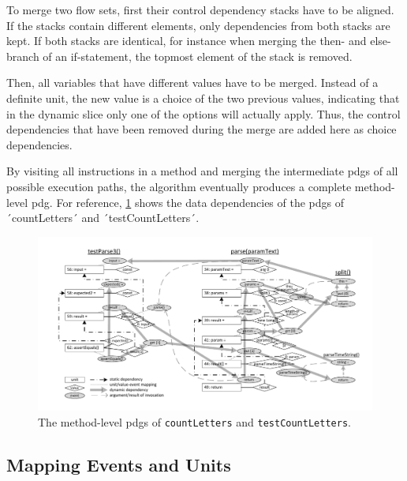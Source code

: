 To merge two flow sets, first their control dependency stacks have to be aligned.
If the stacks contain different elements, only dependencies from both stacks are kept.
If both stacks are identical, for instance when merging the then- and else-branch of an if-statement, the topmost element of the stack is removed.

Then, all variables that have different values have to be merged.
Instead of a definite unit, the new value is a choice of the two previous values, indicating that in the dynamic slice only one of the options will actually apply.
Thus, the control dependencies that have been removed during the merge are added here as choice dependencies.

By visiting all instructions in a method and merging the intermediate \acp{pdg} of all possible execution paths, the algorithm eventually produces a complete method-level \ac{pdg}.
For reference, \cref{fig:graphstatic} shows the data dependencies of the \acp{pdg} of ´countLetters´ and ´testCountLetters´.

\begin{figure}[t]
\centering
\includegraphics[width=.90\linewidth, clip, trim=12mm 7mm 8mm 7mm]{img/graph}
\caption{The method-level \aclp{pdg} of \lstinline+countLetters+ and \lstinline+testCountLetters+.}
\label{fig:graphstatic}
\end{figure}

\subsection{Mapping Events and Units}




